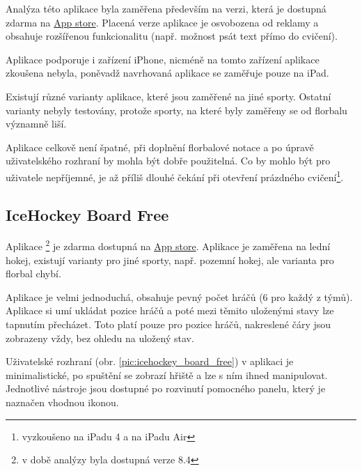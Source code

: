 \documentclass[thesis=B,czech]{FITthesis}[2012/06/26]
\begin{document}
	Analýza této aplikace byla zaměřena především na verzi, která je dostupná zdarma na \href{https://itunes.apple.com/us/app/coachnote-hockey-ringette/id562205341?mt=8}{App store}. Placená verze aplikace je osvobozena od reklamy a obsahuje rozšířenou funkcionalitu (např. možnost psát text přímo do cvičení).

	Aplikace podporuje i zařízení iPhone, nicméně na tomto zařízení aplikace zkoušena nebyla, poněvadž navrhovaná aplikace se zaměřuje pouze na iPad.

	Existují různé varianty aplikace, které jsou zaměřené na jiné sporty. Ostatní varianty nebyly testovány, protože sporty, na které byly zaměřeny se od florbalu významně liší.

	Aplikace celkově není špatné, při doplnění florbalové notace a po úpravě uživatelského rozhraní by mohla být dobře použitelná. Co by mohlo být pro uživatele nepříjemné, je až příliš dlouhé čekání při otevření prázdného cvičení\footnote{vyzkoušeno na iPadu 4 a na iPadu Air}.

	\subsection{IceHockey Board Free}

	Aplikace \footnote{v době analýzy byla dostupná verze 8.4} je zdarma dostupná na \href{https://itunes.apple.com/ca/app/icehockey-board-free/id366079177?mt=8}{App store}. Aplikace je zaměřena na lední hokej, existují varianty pro jiné sporty, např. pozemní hokej, ale varianta pro florbal chybí.

	Aplikace je velmi jednoduchá, obsahuje pevný počet hráčů (6 pro každý z týmů). Aplikace si umí ukládat pozice hráčů a poté mezi těmito uloženými stavy lze tapnutím přecházet. Toto platí pouze pro pozice hráčů, nakreslené čáry jsou zobrazeny vždy, bez ohledu na uložený stav.

	Uživatelské rozhraní (obr. \ref{pic:icehockey_board_free}) v aplikaci je minimalistické, po spuštění se zobrazí hřiště a lze s ním ihned manipulovat. Jednotlivé nástroje jsou dostupné po rozvinutí pomocného panelu, který je naznačen vhodnou ikonou.
\end{document}
